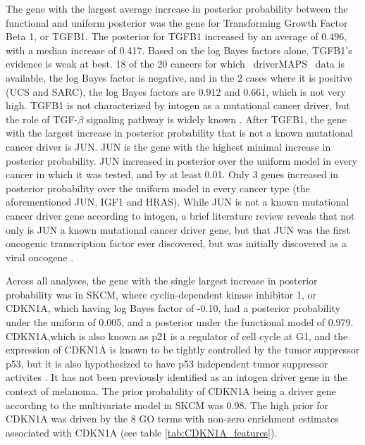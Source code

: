 The gene with the largest average increase in posterior probability between the functional and uniform posterior  was the gene for  Transforming Growth Factor Beta 1, or TGFB1.  The posterior for TGFB1 increased by an average of 0.496, with a median increase of 0.417.  Based on the log Bayes factors alone, TGFB1's evidence is weak at best.  18 of the 20 cancers for which ~driverMAPS~ data is available, the log Bayes factor is negative, and in the 2 cases where it is positive (UCS and SARC), the log Bayes factors are 0.912 and 0.661, which is not very high.  TGFB1 is not characterized by intogen as a mutational cancer driver, but the role of TGF-$\beta$ signaling pathway is widely known \cite{TGF_Zhao_2018}. After TGFB1, the gene with the largest increase in posterior probability that is not a known mutational cancer driver is JUN.  JUN is the gene with the highest minimal increase in posterior probability.  JUN increased in posterior over the uniform model in every cancer in which it was tested, and by at least 0.01.  Only 3 genes increased in posterior probability over the uniform model in every cancer type (the aforementioned JUN, IGF1 and HRAS). While JUN is not a known mutational cancer driver gene according to intogen, a brief literature review reveals that not only is JUN a known mutational cancer driver gene, but that JUN was the first oncogenic transcription factor ever discovered, but was initially discovered as a viral oncogene \cite{Vogt_2002}.  


Across all analyses, the gene with the single largest increase in posterior probability was in SKCM, where cyclin-dependent kinase inhibitor 1, or CDKN1A, which having log Bayes factor of -0.10, had a posterior probability under the uniform of 0.005, and a posterior under the functional model of 0.979.  CDKN1A,which is also known as p21 is a regulator of cell cycle at G1, and the expression of CDKN1A is known to be tightly controlled by the tumor suppressor p53, but it is also hypothesized to have p53 independent tumor suppressor activites \cite{abbas09_p21_cancer}.  It has not been previously identified as an intogen driver gene in the context of melanoma. The prior probability of CDKN1A being a driver gene according to the multivariate model in SKCM was 0.98.  The high prior for CDKN1A was driven by the 8 GO terms with non-zero enrichment estimates associated with CDKN1A (see table \ref{tab:CDKN1A_features}).


